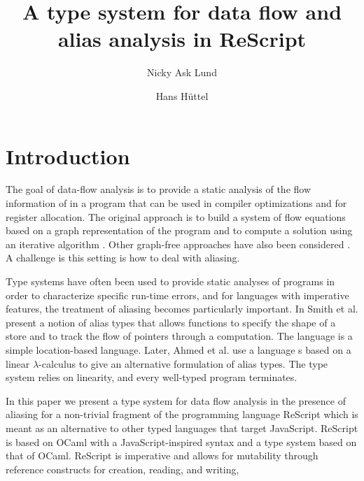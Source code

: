 \documentclass{llncs}
\begin{document}
\title{A type system for data flow and alias analysis in ReScript}

\author{Nicky Ask Lund  \and Hans Hüttel } 

\maketitle





\section{Introduction}

The goal of data-flow analysis is to provide a static analysis of the
flow information of in a program that can be used in compiler
optimizations and for register allocation. The original approach is to
build a system of flow equations based on a graph representation of
the program and to compute a solution using an iterative algorithm
\cite{KildallGaryA1973Auat,RyderBarbara1988Idaa}. Other graph-free
approaches have also been considered
\cite{HorspoolR.Niegel2002AGAt}. A challenge is this setting is how to
deal with aliasing.

Type systems have often been used to provide static analyses of
programs in order to characterize specific run-time errors, and for
languages with imperative features, the treatment of aliasing becomes
particularly important. In \cite{10.1007/3-540-46425-5_24} Smith et
al. present a notion of alias types that allows functions to specify
the shape of a store and to track the flow of pointers through a
computation. The language is a simple location-based language. Later,
Ahmed et al. \cite{DBLP:conf/tlca/MorrisettAF05} use a language s
based on a linear $\lambda$-calculus to give an alternative
formulation of alias types. The type system relies on linearity, and
every well-typed program terminates.

In this paper we present a type system for data flow analysis in the
presence of aliasing for a non-trivial fragment of the programming
language ReScript which is meant as an alternative to other typed
languages that target JavaScript. ReScript is based on OCaml with a
JavaScript-inspired syntax and a type system based on that of
OCaml\cite{rescript_rebrand}. ReScript is imperative and allows for
mutability through reference constructs for creation, reading, and
writing,
\end{document}
